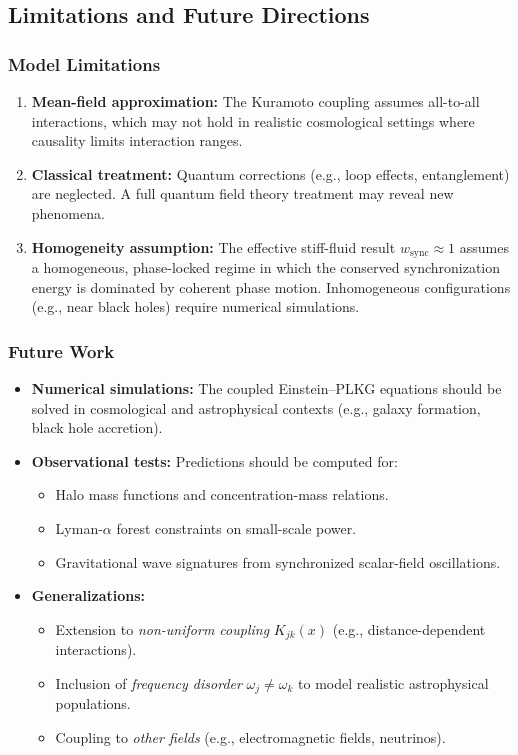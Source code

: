 \subsection{Limitations and Future Directions}
\label{subsec:limitations}

\subsubsection{Model Limitations}
\begin{enumerate}
    \item \textbf{Mean-field approximation:} The Kuramoto coupling assumes all-to-all interactions, which may not hold in realistic cosmological settings where causality limits interaction ranges.
    \item \textbf{Classical treatment:} Quantum corrections (e.g., loop effects, entanglement) are neglected. A full quantum field theory treatment may reveal new phenomena.
    \item \textbf{Homogeneity assumption:} The effective stiff-fluid result $w_{\text{sync}} \approx 1$ assumes a homogeneous, phase-locked regime in which the conserved synchronization energy is dominated by coherent phase motion. Inhomogeneous configurations (e.g., near black holes) require numerical simulations.
\end{enumerate}

\subsubsection{Future Work}
\begin{itemize}
    \item \textbf{Numerical simulations:} The coupled Einstein--PLKG equations should be solved in cosmological and astrophysical contexts (e.g., galaxy formation, black hole accretion).
    \item \textbf{Observational tests:} Predictions should be computed for:
    \begin{itemize}
        \item Halo mass functions and concentration-mass relations.
        \item Lyman-$\alpha$ forest constraints on small-scale power.
        \item Gravitational wave signatures from synchronized scalar-field oscillations.
    \end{itemize}
    \item \textbf{Generalizations:}
    \begin{itemize}
        \item Extension to \emph{non-uniform coupling} $K_{jk}(x)$ (e.g., distance-dependent interactions).
        \item Inclusion of \emph{frequency disorder} $\omega_j \neq \omega_k$ to model realistic astrophysical populations.
        \item Coupling to \emph{other fields} (e.g., electromagnetic fields, neutrinos).
    \end{itemize}
\end{itemize}

